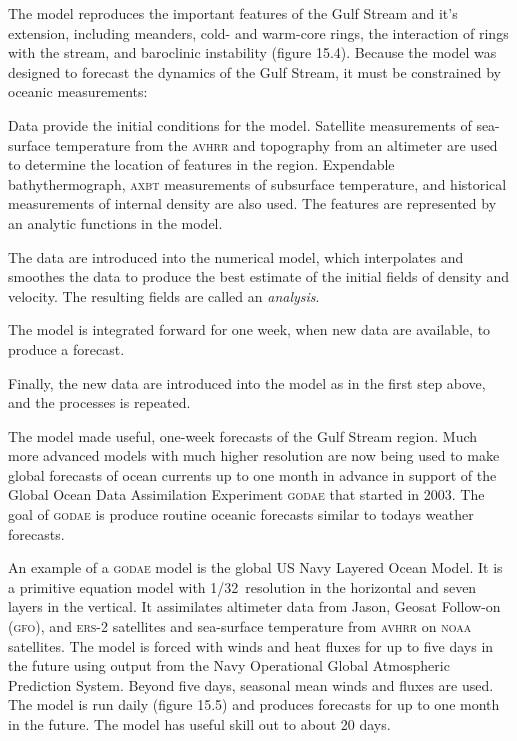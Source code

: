 The model reproduces the important features of the Gulf
Stream and it's extension, including
meanders, cold- and warm-core rings, the interaction of rings with the
stream, and baroclinic instability (figure 15.4). Because the model
was designed to forecast the dynamics of the Gulf Stream, it must be
constrained by oceanic measurements:
\begin{enumerate}
\vitem Data provide the initial conditions for the model. Satellite
measurements of sea-surface temperature from the \textsc{avhrr}
and topography
from an altimeter are used to determine the location of features in
the region.  Expendable bathythermograph, \textsc{axbt} measurements of subsurface
temperature, and historical measurements of internal density are also
used. The features are represented by an analytic functions in the
model.

\vitem The data are introduced into the numerical model, which
interpolates and smoothes the data to produce the best estimate of the
initial fields of density and velocity. The resulting fields are
called an \textit{analysis}.

\vitem The model is integrated forward for one week, when new data are
available, to produce a forecast.

\vitem Finally, the new data are introduced into the model as in the
first step above, and the processes is repeated.
\end{enumerate}
The model made useful, one-week forecasts of the Gulf
Stream region. Much more advanced models
with much higher resolution are now being used to make global
forecasts of ocean currents up to one month in advance in support of
the Global Ocean Data Assimilation Experiment
\textsc{godae}  that started in 2003. The goal of
\textsc{godae} is produce routine oceanic forecasts similar to todays
weather forecasts.

An example of a \textsc{godae} model is the global US Navy Layered
Ocean Model. It is a
primitive equation model with 1/32\degrees\ resolution in the
horizontal and seven layers in the vertical. It assimilates altimeter
data from Jason, Geosat Follow-on (\textsc{gfo}), and \textsc{ers}-2
satellites and sea-surface temperature from
\textsc{avhrr} on \textsc{noaa} satellites. The
model is forced with winds and heat fluxes for up to five days in the
future using output from the Navy Operational Global Atmospheric
Prediction System. Beyond five days, seasonal mean winds and fluxes
are used. The model is run daily (figure 15.5) and produces forecasts
for up to one month in the future. The model has useful skill out to
about 20 days.

